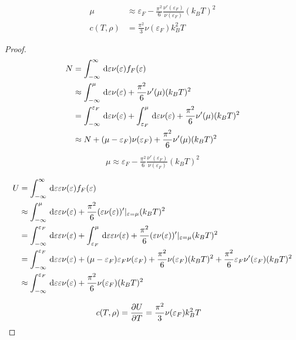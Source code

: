 \documentclass[a4paper,11pt]{jlreq}
\begin{document}
\begin{theorem}
  \begin{align}
    \mu        & \approx \varepsilon_F - \frac{\pi^2}{6}\frac{\nu'(\varepsilon_F)}{\nu(\varepsilon_F)}(k_BT)^2 \\
    c(T, \rho) & = \frac{\pi^2}{3}\nu(\varepsilon_F)k_B^2T
  \end{align}
\end{theorem}
\begin{proof}
  \begin{align}
    N & = \int_{-\infty}^{\infty}\dl{\varepsilon}\nu(\varepsilon)f_F(\varepsilon)                                                                                        \\
      & \approx \int_{-\infty}^{\mu}\dl{\varepsilon}\nu(\varepsilon) + \frac{\pi^2}{6}\nu'(\mu)(k_BT)^2                                                                  \\
      & = \int_{-\infty}^{\varepsilon_F}\dl{\varepsilon}\nu(\varepsilon) + \int_{\varepsilon_F}^{\mu}\dl{\varepsilon}\nu(\varepsilon) + \frac{\pi^2}{6}\nu'(\mu)(k_BT)^2 \\
      & \approx N + (\mu - \varepsilon_F)\nu(\varepsilon_F) + \frac{\pi^2}{6}\nu'(\mu)(k_BT)^2
  \end{align}
  \begin{align}
    \mu \approx \varepsilon_F - \frac{\pi^2}{6}\frac{\nu'(\varepsilon_F)}{\nu(\varepsilon_F)}(k_BT)^2
  \end{align}


  \begin{align}
    U & = \int_{-\infty}^{\infty}\dl{\varepsilon}\varepsilon\nu(\varepsilon)f_F(\varepsilon)                                                                                                                                                     \\
      & \approx \int_{-\infty}^\mu\dl{\varepsilon}\varepsilon\nu(\varepsilon) + \frac{\pi^2}{6}(\varepsilon\nu(\varepsilon))'|_{\varepsilon = \mu}(k_BT)^2                                                                                       \\
      & = \int_{-\infty}^{\varepsilon_F}\dl{\varepsilon}\varepsilon\nu(\varepsilon) + \int_{\varepsilon_F}^\mu\dl{\varepsilon}\varepsilon\nu(\varepsilon) + \frac{\pi^2}{6}(\varepsilon\nu(\varepsilon))'|_{\varepsilon = \mu}(k_BT)^2           \\
      & = \int_{-\infty}^{\varepsilon_F}\dl{\varepsilon}\varepsilon\nu(\varepsilon) + (\mu - \varepsilon_F)\varepsilon_F\nu(\varepsilon_F) + \frac{\pi^2}{6}\nu(\varepsilon_F)(k_BT)^2 + \frac{\pi^2}{6}\varepsilon_F\nu'(\varepsilon_F)(k_BT)^2 \\
      & \approx \int_{-\infty}^{\varepsilon_F}\dl{\varepsilon}\varepsilon\nu(\varepsilon) + \frac{\pi^2}{6}\nu(\varepsilon_F)(k_BT)^2
  \end{align}

  \begin{align}
    c(T, \rho) & = \diffp{U}{T} = \frac{\pi^2}{3}\nu(\varepsilon_F)k_B^2T
  \end{align}
\end{proof}
\end{document}
